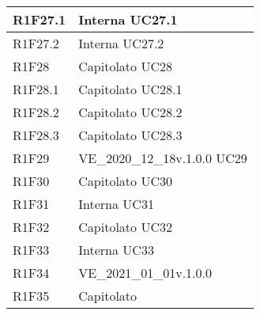 \begin{center}
\begin{longtable}{|p{22mm}|p{44mm}|}
R1F27.1 &
Interna \newline
UC27.1 \newline
\\
\hline

R1F27.2 &
Interna \newline
UC27.2 \newline
\\
\hline

R1F28 &
Capitolato \newline
UC28 \newline
\\
\hline

R1F28.1 &
Capitolato \newline
UC28.1 \newline
\\
\hline

R1F28.2 &
Capitolato \newline
UC28.2 \newline
\\
\hline

R1F28.3 &
Capitolato \newline
UC28.3 \newline
\\
\hline

R1F29 &
VE\_2020\_12\_18v.1.0.0 \newline
UC29 \newline
\\
\hline

R1F30 &
Capitolato \newline
UC30 \newline
\\
\hline

R1F31 &
Interna \newline
UC31 \newline
\\
\hline

R1F32 &
Capitolato \newline
UC32 \newline
\\
\hline

R1F33 &
Interna \newline
UC33 \newline
\\
\hline

R1F34 &
VE\_2021\_01\_01v.1.0.0 \newline
\\
\hline

R1F35 &
Capitolato \newline
\\
\hline


\end{longtable}
\end{center}
